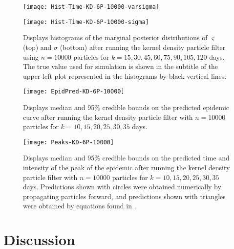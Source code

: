 \documentclass{article}
\begin{document}
\begin{figure}[ht]
\centering
\begin{minipage}[b]{1.0\linewidth}
\texttt{[image: Hist-Time-KD-6P-10000-varsigma]}
\end{minipage}
\begin{minipage}[b]{1.0\linewidth}
\texttt{[image: Hist-Time-KD-6P-10000-sigma]}
\end{minipage}
\caption{Displays histograms of the marginal posterior distributions of $\varsigma$ (top) and $\sigma$ (bottom) after running the kernel density particle filter using $n = 10000$ particles for $k = 15,30,45,60,75,90,105,120$ days.  The true value used for simulation is shown in the subtitle of the upper-left plot represented in the histograms by black vertical lines.} \label{fig:histvarsigmasigma}
\end{figure}

\begin{figure}[ht]
\centering
\texttt{[image: EpidPred-KD-6P-10000]}
\caption{Displays median and 95\% credible bounds on the predicted epidemic curve after running the kernel density particle filter with $n = 10000$ particles for $k = 10,15,20,25,30,35$ days.}
\label{fig:pred}
\end{figure}

\begin{figure}[ht]
\centering
\texttt{[image: Peaks-KD-6P-10000]}
\caption{Displays median and 95\% credible bounds on the predicted time and intensity of the peak of the epidemic after running the kernel density particle filter with $n = 10000$ particles for $k = 10,15,20,25,30,35$ days.  Predictions shown with circles were obtained numerically by propagating particles forward, and predictions shown with triangles were obtained by equations found in \citet{skvortsov2012monitoring}.}
\end{figure}

\clearpage

\section{Discussion \label{sec:discussion}}



\end{document}
